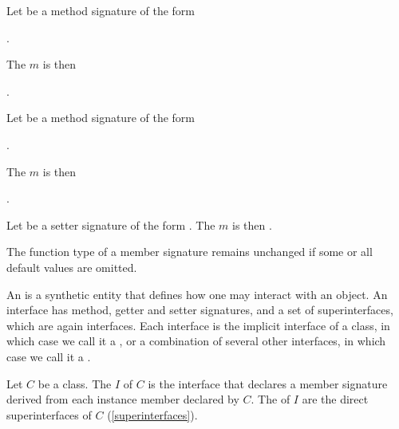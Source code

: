 \documentclass[makeidx]{article}
\begin{document}
\LMHash{}%
Let  be a method signature of the form

\noindent
{}

\noindent
{}

\noindent
\code{\qquad\qquad[\PairList{\COVARIANT?\ T}{= d}{n+1}{n+k}])}.

\noindent
The 
$m$ is then

\noindent
{}.

\LMHash{}%
Let  be a method signature of the form

\noindent
{}

\noindent
{}

\noindent
{}.

\noindent
The  $m$ is then

\noindent
{}.

\LMHash{}%
Let  be a setter signature of the form
.
The  $m$ is then
.

\LMHash{}%
The function type of a member signature remains unchanged if
some or all default values are omitted.


\LMHash{}%
An  is a synthetic entity that defines
how one may interact with an object.
An interface has method, getter and setter signatures,
and a set of superinterfaces,
which are again interfaces.
Each interface is the implicit interface of a class,
in which case we call it a
,
or a combination of several other interfaces,
in which case we call it a
.

\LMHash{}%
Let $C$ be a class.
The  $I$ of $C$ is the interface that declares
a member signature derived from
each instance member declared by $C$.
The  of $I$ are the direct superinterfaces of $C$
(\ref{superinterfaces}).
\end{document}

